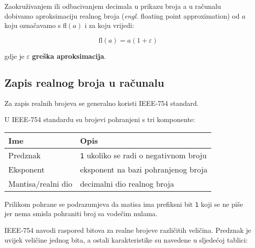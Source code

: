 Zaokruživanjem ili odbacivanjem decimala u prikazu broja a u računalu dobivamo aproksimaciju realnog broja (\textit{engl.} floating point approximation) od $a$ koju označavamo s fl$(a)$ i za koju vrijedi:

$$
\text{fl}(a) = a(1+\varepsilon)
$$

gdje je $\varepsilon$ \textbf{greška aproksimacija}.

\newpage

\subsection{Zapis realnog broja u računalu}

Za zapis realnih brojeva se generalno koristi IEEE-754 standard.

U IEEE-754 standardu su brojevi pohranjeni s tri komponente:

\begin{center}
    \begin{tabular}{|l|l|}
        \hline
        Ime&Opis\\
        \hline
        Predznak&\verb|1| ukoliko se radi o negativnom broju\\
        Eksponent&eksponent na bazi pohranjenog broja\\
        Mantisa/realni dio&decimalni dio realnog broja\\
        \hline
    \end{tabular}
\end{center}

Prilikom pohrane se podrazumjeva da matisa ima prefiksni bit \verb|1| koji se ne piše jer nema smisla pohraniti broj sa vodečim nulama.

IEEE-754 navodi raspored bitova za realne brojeve različitih veličina. Predznak je uvijek veličine jednog bita, a ostali karakteristike su navedene u sljedećoj tablici:


